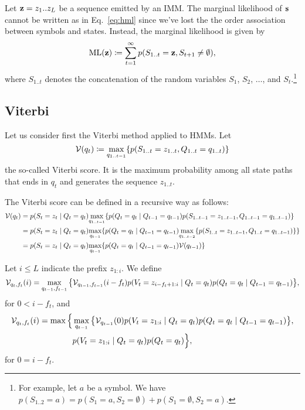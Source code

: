 Let $\mathbf{z}=z_1 .. z_L$ be a sequence emitted by an IMM.\@
The marginal likelihood of $\mathbf{s}$ cannot be written as in Eq.~\eqref{eq:hml} since
we've lost the the order association between symbols and states.
Instead, the marginal likelihood is given by
\begin{equation}\label{eq:ml}
  \mathrm{ML}(\mathbf{z}) \coloneqq \sum_{t=1}^{\infty} p(S_{1..t}=\mathbf{z}, S_{t+1}\neq \emptyset),
\end{equation}
where $S_{1..t}$ denotes the concatenation of the random variables $S_1$, $S_2$,
$\dots$, and $S_t$.\footnote{For example, let $a$ be a symbol. We have
$p(S_{1..2}=a) = p(S_1=a, S_2=\emptyset) + p(S_1=\emptyset, S_2=a)$.}

\subsection{Viterbi}

Let us consider first the Viterbi method applied to HMMs.
Let
\begin{equation*}
  \mathcal{V}(q_t) \coloneqq \underset{q_{1..t-1}}{\max} \{ p(S_{1..t}=z_{1..t}, Q_{1..t}=q_{1..t}) \}
\end{equation*}
the so-called Viterbi score.
It is the maximum probability among all state paths that ends in $q_t$ and generates
the sequence $z_{1..t}$.

The Viterbi score can be defined in a recursive way as follows:
\begin{equation*}
\begin{split}
  \mathcal{V}(q_t)
  &= p(S_t=z_t \;|\; Q_t=q_t) \underset{q_{1..t-1}}{\max}
    \{ p(Q_t=q_t \;|\; Q_{t-1}=q_{t-1}) p(S_{1..t-1}=z_{1..t-1}, Q_{1..t-1}=q_{1..t-1}) \} \\
  &= p(S_t=z_t \;|\; Q_t=q_t) \underset{q_{t-1}}{\max}
    \{ p(Q_t=q_t \;|\; Q_{t-1}=q_{t-1})
    \underset{q_{1..t-2}}{\max} \{ p(S_{1..t}=z_{1..t-1}, Q_{1..t}=q_{1..t-1}) \} \} \\
  &= p(S_t=z_t \;|\; Q_t=q_t) \underset{q_{t-1}}{\max} \{ p(Q_t=q_t \;|\; Q_{t-1}=q_{t-1})
    \mathcal{V}(q_{t-1}) \}
\end{split}
\end{equation*}

Let $i \leq L$ indicate the prefix $z_{1:i}$.
We define
\begin{align*}
  \mathcal{V}_{q_t,f_t}(i) =
  \max_{q_{t-1}, f_{t-1}}
  \big\{
    \mathcal{V}_{q_{t-1},f_{t-1}}(i-f_t) p(V_t=z_{i-f_t+1:i} \;|\; Q_t=q_t) p(Q_t=q_t \;|\;
    Q_{t-1}=q_{t-1})
  \big\},
\end{align*}
for $0 < i - f_t$,
and
\begin{align*}
  \mathcal{V}_{q_t,f_t}(i) =
  \max
  \Big\{
    &\max_{q_{t-1}}
    \big\{
      \mathcal{V}_{q_{t-1}}(0) p(V_t=z_{1:i} \;|\; Q_t=q_t) p(Q_t=q_t \;|\;
      Q_{t-1}=q_{t-1})
    \big\},\\
    &p(V_t=z_{1:i} \;|\; Q_t=q_t) p(Q_t=q_t)
  \Big\},
\end{align*}
for $0 = i - f_t$.

